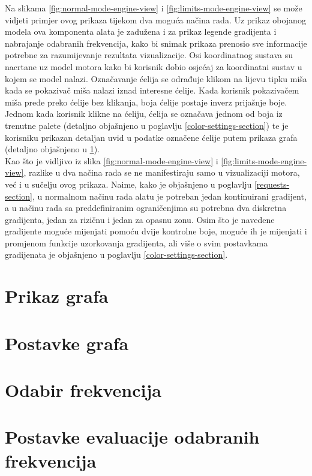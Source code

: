 \documentclass[times, utf8, diplomski]{fer}
\begin{document}
Na slikama \ref{fig:normal-mode-engine-view} i \ref{fig:limits-mode-engine-view} se može vidjeti primjer ovog prikaza tijekom dva moguća načina rada. Uz prikaz obojanog modela ova komponenta alata je zadužena i za prikaz legende gradijenta i nabrajanje odabranih frekvencija, kako bi snimak prikaza prenosio sve informacije potrebne za razumijevanje rezultata vizualizacije. Osi koordinatnog sustava su nacrtane uz model motora kako bi korisnik dobio osjećaj za koordinatni sustav u kojem se model nalazi. Označavanje ćelija se odrađuje klikom na lijevu tipku miša kada se pokazivač miša nalazi iznad interesne ćelije. Kada korisnik pokazivačem miša pređe preko ćelije bez klikanja, boja ćelije postaje inverz prijašnje boje. Jednom kada korisnik klikne na ćeliju, ćelija se označava jednom od boja iz trenutne palete (detaljno objašnjeno u poglavlju \ref{color-settings-section}) te je korisniku prikazan detaljan uvid u podatke označene ćelije putem prikaza grafa (detaljno objašnjeno u \ref{graph-view-section}).\\
Kao što je vidljivo iz slika \ref{fig:normal-mode-engine-view} i \ref{fig:limits-mode-engine-view}, razlike u dva načina rada se ne manifestiraju samo u vizualizaciji motora, već i u sučelju ovog prikaza. Naime, kako je objašnjeno u poglavlju \ref{requests-section}, u normalnom načinu rada alatu je potreban jedan kontinuirani gradijent, a u načinu rada sa preddefiniranim ograničenjima su potrebna dva diskretna gradijenta, jedan za rizičnu i jedan za opasnu zonu. Osim što je navedene gradijente moguće mijenjati pomoću dvije kontrolne boje, moguće ih je mijenjati i promjenom funkcije uzorkovanja gradijenta, ali više o svim postavkama gradijenata je objašnjeno u poglavlju \ref{color-settings-section}.




\section{Prikaz grafa} \label{graph-view-section}

\section{Postavke grafa}

\section{Odabir frekvencija}

\section{Postavke evaluacije odabranih frekvencija}
\end{document}
